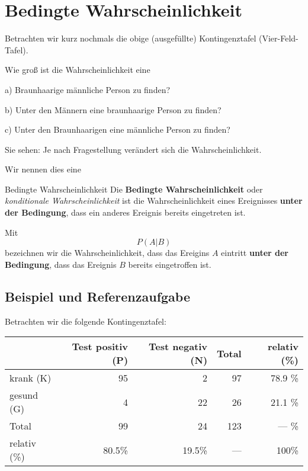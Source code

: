 
\section{Bedingte Wahrscheinlichkeit}

Betrachten wir kurz nochmals die obige (ausgefüllte) Kontingenztafel (Vier-Feld-Tafel).


Wie groß ist die Wahrscheinlichkeit eine

a) Braunhaarige männliche Person zu finden? 

b) Unter den Männern eine braunhaarige Person zu finden? 

c) Unter den Braunhaarigen eine männliche Person zu finden? 

Sie sehen: Je nach Fragestellung verändert sich die Wahrscheinlichkeit.

Wir nennen dies eine

\begin{definition}{Bedingte Wahrscheinlichkeit}{}
Die \textbf{Bedingte Wahrscheinlichkeit} oder \textit{konditionale
  Wahrscheinlichkeit} ist die Wahrscheinlichkeit eines Ereignisses
\textbf{unter der Bedingung}, dass ein anderes Ereignis bereits
eingetreten ist.
  \end{definition}

\begin{definition}{}{}
  Mit
  $$P(A | B)$$
  bezeichnen wir die Wahrscheinlichkeit, dass das Ereigins $A$
  eintritt \textbf{unter der Bedingung}, dass das Ereignis $B$ bereits
  eingetroffen ist.
\end{definition}
\newpage


\subsection{Beispiel und Referenzaufgabe}
Betrachten wir die folgende Kontingenztafel:

  \begin{tabular}{|l|r|r|r|r|}\hline
                 & Test positiv (P) & Test negativ (N)& Total & relativ (\%) \\\hline
    krank (K)        & 95           & 2            & 97    & 78.9 \%      \\\hline    
    gesund (G)    & 4            & 22           & 26    & 21.1 \%      \\\hline
    Total        & 99           & 24           & 123   &  --- \%      \\\hline
    relativ (\%) & 80.5\%       &19.5\%        & ---   &   100\%      \\\hline

  \end{tabular}
  
